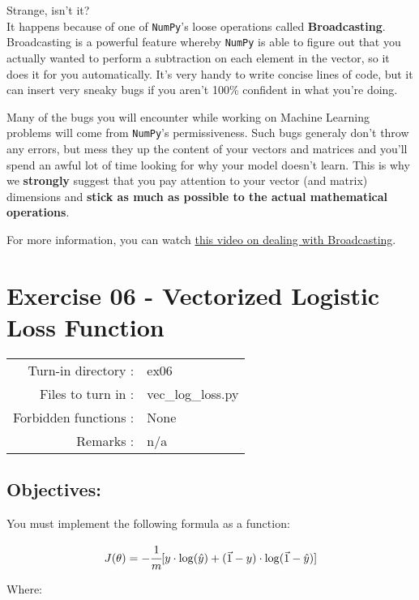 \documentclass[]{article}
\begin{document}
Strange, isn't it?\\
It happens because of one of \texttt{NumPy}'s loose operations called
\textbf{Broadcasting}. Broadcasting is a powerful feature whereby
\texttt{NumPy} is able to figure out that you actually wanted to perform
a subtraction on each element in the vector, so it does it for you
automatically. It's very handy to write concise lines of code, but it
can insert very sneaky bugs if you aren't 100\% confident in what you're
doing.

Many of the bugs you will encounter while working on Machine Learning
problems will come from \texttt{NumPy}'s permissiveness. Such bugs
generaly don't throw any errors, but mess they up the content of your
vectors and matrices and you'll spend an awful lot of time looking for
why your model doesn't learn. This is why we \textbf{strongly} suggest
that you pay attention to your vector (and matrix) dimensions and
\textbf{stick as much as possible to the actual mathematical
operations}.

For more information, you can watch
\href{https://www.youtube.com/watch?v=V2QlTmh6P2Y\&t=213s}{this video on
dealing with Broadcasting}. \clearpage

\hypertarget{exercise-06---vectorized-logistic-loss-function-1}{%
\section{Exercise 06 - Vectorized Logistic Loss
Function}\label{exercise-06---vectorized-logistic-loss-function-1}}

\begin{longtable}[]{@{}rl@{}}
\toprule
\endhead
Turn-in directory : & ex06\tabularnewline
Files to turn in : & vec\_log\_loss.py\tabularnewline
Forbidden functions : & None\tabularnewline
Remarks : & n/a\tabularnewline
\bottomrule
\end{longtable}

\hypertarget{objectives-5}{%
\subsection{Objectives:}\label{objectives-5}}

You must implement the following formula as a function:

\large

\[
J( \theta) = -\cfrac{1} {m} \lbrack y \cdot \log(\hat{y}) + (\vec{1} - y) \cdot \log(\vec{1} - \hat{y})\rbrack
\] \normalsize

Where:
\end{document}
